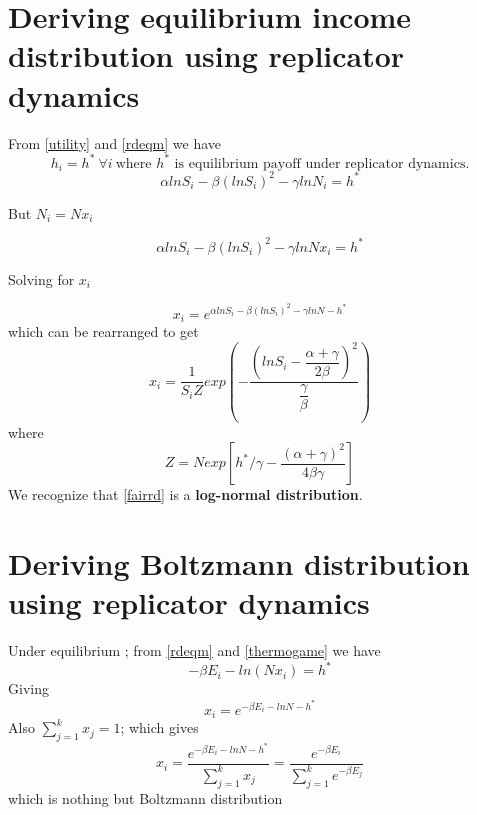 \documentclass[letterpaper,english,12pt]{article}
\begin{document}
 \section{Deriving equilibrium income distribution using replicator dynamics}
 From \ref{utility} and \ref{rdeqm} we have 
 \begin{equation}
     h_i = h^* ~\forall i ~\text{where $h^*$ is equilibrium payoff under replicator dynamics.} 
 \end{equation}
 \begin{equation}
     \alpha ln S_i - \beta (ln S_i)^2 -\gamma ln N_i = h^* 
 \end{equation}
 
 But $N_i = Nx_i$
 
 \begin{equation}
     \alpha ln S_i - \beta (ln S_i)^2 -\gamma ln Nx_i = h^* 
 \end{equation}
 
 Solving for $x_i$
 
 \begin{equation}
     x_i = e^{\alpha ln S_i - \beta (ln S_i)^2 -\gamma ln N - h^*}
 \end{equation}
 which can be rearranged to get 
 \begin{equation}\label{fairrd}
     x_i = \dfrac{1}{S_i Z}exp(-\dfrac{(lnS_i - \dfrac{\alpha+\gamma}{2\beta})^2 }{\dfrac{\gamma}{\beta}})
 \end{equation}
 where 
 \begin{equation}
     Z = N exp[h^*/\gamma - \dfrac{(\alpha + \gamma)^2}{4\beta \gamma}]
 \end{equation}
 We recognize that \ref{fairrd} is a \textbf{log-normal distribution}.
 \section{Deriving Boltzmann distribution using replicator dynamics }
     Under equilibrium ; from \ref{rdeqm} and \ref{thermogame} we have 
     \begin{equation}
         -\beta E_i -ln(Nx_i) = h^*
     \end{equation}
     Giving
     \begin{equation}
         x_i = e^{-\beta E_i -ln N -h^*}
     \end{equation}
     Also $\sum_{j=1}^{k}x_j=1$; which gives
     \begin{equation}
         x_i = \frac{e^{-\beta E_i -ln N -h^*}}{\sum_{j=1}^{k}x_j} = \frac{e^{-\beta E_i}}{\sum_{j=1}^{k}e^{-\beta E_j}}
     \end{equation}
     which is nothing but Boltzmann distribution
  
\end{document}

